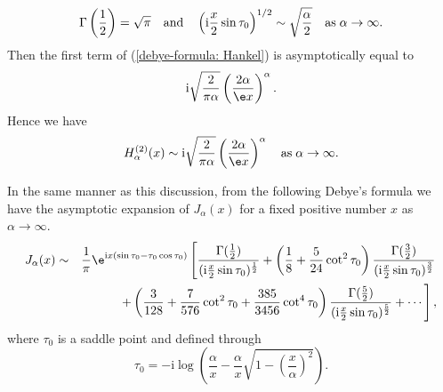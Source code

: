 \begin{rem}
\begin{displaymath}
\Gamma\left(\frac{1}{2}\right)=\sqrt{\pi} \quad {\rm and} \quad \left(\mathrm{i}\frac{x}{2}\sin\tau_0\right)^{1/2} \sim \sqrt{\frac{\alpha}{2}}\quad {\rm as}\;\alpha\rightarrow\infty.
\end{displaymath}
Then the first term of (\ref{debye-formula: Hankel}) is asymptotically equal to
\begin{displaymath}
\mathrm{i}\sqrt{\frac{2}{\pi\alpha}}\left(\frac{2\alpha}{\e x}\right)^\alpha.
\end{displaymath}
Hence we have
\begin{displaymath}
H^{(2)}_\alpha(x) \sim \mathrm{i}\sqrt{\frac{2}{\pi\alpha}}\left(\frac{2\alpha}{\e x}\right)^\alpha \quad {\rm as}\;\alpha\rightarrow\infty.
\end{displaymath}

In the same manner as this discussion, from the following Debye's formula\cite{Debye} we have the asymptotic expansion of $J_\alpha(x)$ for a fixed positive number $x$ as $\alpha\rightarrow\infty$.
\begin{eqnarray}
J_{\alpha}(x)&\sim&\frac{\mathrm{1}}{\pi}\e^{\mathrm{i}x(\sin\tau_0-\tau_0\cos\tau_0)}\left[\frac{\Gamma(\frac{1}{2})}{(\mathrm{i}\frac{x}{2}\sin\tau_0)^{\frac{1}{2}}}+\left(\frac{1}{8}+\frac{5}{24}\cot^2\tau_0\right)\frac{\Gamma(\frac{3}{2})}{(\mathrm{i}\frac{x}{2}\sin\tau_0)^{\frac{3}{2}}}\right. \nonumber\\
&&\left.+\left(\frac{3}{128}+\frac{7}{576}\cot^2\tau_0+\frac{385}{3456}\cot^4\tau_0\right)\frac{\Gamma(\frac{5}{2})}{(\mathrm{i}\frac{x}{2}\sin\tau_0)^{\frac{5}{2}}}+\cdots\right],
\label{debye-formula: Bessel}
\end{eqnarray}
where $\tau_0$ is a saddle point and defined through
\begin{equation}
\tau_0=-\mathrm{i}\log\left(\frac{\alpha}{x}-\frac{\alpha}{x}\sqrt{1-\left(\frac{x}{\alpha}\right)^2}\right).
\label{tau_0-2}
\end{equation}
\end{rem}

